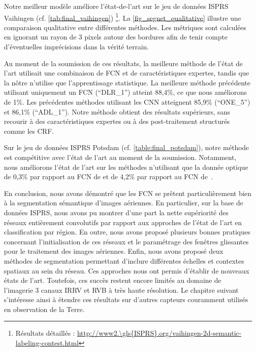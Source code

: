 Notre meilleur modèle améliore l'état-de-l'art sur le jeu de données \gls{ISPRS} Vaihingen (cf. \cref{tab:final_vaihingen}) \footnote{Résultats détaillés : \url{http://www2.\gls{ISPRS}.org/vaihingen-2d-semantic-labeling-contest.html}}. La \cref{fig_segnet_qualitative} illustre une comparaison qualitative entre différentes méthodes. Les métriques sont calculées en ignorant un rayon de $3$ pixels autour des bordures afin de tenir compte d'éventuelles imprécisions dans la vérité terrain.

Au moment de la soumission de ces résultats, la meilleure méthode de l'état de l'art utilisait une combinaison de \gls{FCN} et de caractéristiques expertes, tandis que la nôtre n'utilise que l'apprentissage statistique. La meilleure méthode précédente utilisant uniquement un \gls{FCN} (``DLR\_1'') atteint 88,4\%, ce que nous améliorons de 1\%. Les précédentes méthodes utilisant les \gls{CNN} atteignent 85,9\% (``ONE\_5''\cite{boulch_dag_2015}) et 86,1\% (``ADL\_1''\cite{paisitkriangkrai_effective_2015}). Notre méthode obtient des résultats supérieurs, sans recourir à des caractéristiques expertes ou à des post-traitement structurés comme les \gls{CRF}.

Sur le jeu de données \gls{ISPRS} Potsdam (cf. \cref{table:final_potsdam}), notre méthode est compétitive avec l'état de l'art au moment de la soumission. Notamment, nous améliorons l'état de l'art sur les méthodes n'utilisant que la donnée optique de 0,3\% par rapport au \gls{FCN} de \citet{sherrah_fully_2016} et de 4,2\% par rapport au \gls{FCN} de~\citet{volpi_dense_2017}.

En conclusion, nous avons démontré que les \gls{FCN} se prêtent particulièrement bien à la segmentation sémantique d'images aériennes. En particulier, sur la base de données \gls{ISPRS}, nous avons pu montrer d'une part la nette supériorité des réseaux entièrement convolutifs par rapport aux approches de l'état de l'art en classification par région. En outre, nous avons proposé plusieurs bonnes pratiques concernant l'initialisation de ces réseaux et le paramétrage des fenêtres glissantes pour le traitement des images aériennes. Enfin, nous avons proposé deux méthodes de segmentation permettant d'inclure différentes échelles et contextes spatiaux au sein du réseau. Ces approches nous ont permis d'établir de nouveaux états de l'art. Toutefois, ces succès restent encore limités au domaine de l'imagerie 3 canaux \gls{IRRV} et \gls{RVB} à très haute résolution. Le chapitre suivant s'intéresse ainsi à étendre ces résultats sur d'autres capteurs couramment utilisés en observation de la Terre.

%
%
\printbibliography
